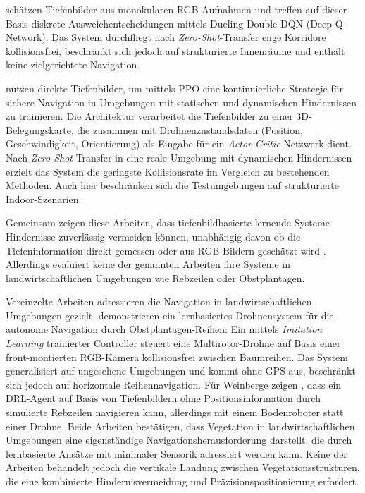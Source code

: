 \textcite{kimMonocularVisionbasedAutonomous2022} schätzen Tiefenbilder aus monokularen RGB-Aufnahmen und treffen auf dieser Basis diskrete Ausweichentscheidungen mittels Dueling-Double-DQN (Deep Q-Network). Das System durchfliegt nach \textit{Zero-Shot}-Transfer enge Korridore kollisionsfrei, beschränkt sich jedoch auf strukturierte Innenräume und enthält keine zielgerichtete Navigation.

\textcite{xuNavRLLearningSafe2024} nutzen direkte Tiefenbilder, um mittels PPO eine kontinuierliche Strategie für sichere Navigation in Umgebungen mit statischen und dynamischen Hindernissen zu trainieren. Die Architektur verarbeitet die Tiefenbilder zu einer 3D-Belegungskarte, die zusammen mit Drohnenzustandsdaten (Position, Geschwindigkeit, Orientierung) als Eingabe für ein \textit{Actor-Critic}-Netzwerk dient. Nach \textit{Zero-Shot}-Transfer in eine reale Umgebung mit dynamischen Hindernissen erzielt das System die geringste Kollisionsrate im Vergleich zu bestehenden Methoden. Auch hier beschränken sich die Testumgebungen auf strukturierte Indoor-Szenarien.

Gemeinsam zeigen diese Arbeiten, dass tiefenbildbasierte lernende Systeme Hindernisse zuverlässig vermeiden können, unabhängig davon ob die Tiefeninformation direkt gemessen \autocite{loquercioLearningHighspeedFlight2021, xuNavRLLearningSafe2024} oder aus RGB-Bildern geschätzt wird \autocite{kimMonocularVisionbasedAutonomous2022}. Allerdings evaluiert keine der genannten Arbeiten ihre Systeme in landwirtschaftlichen Umgebungen wie Rebzeilen oder Obstplantagen.

Vereinzelte Arbeiten adressieren die Navigation in landwirtschaftlichen Umgebungen gezielt. \textcite{weiVisionbasedNavigationUnmanned2025} demonstrieren ein lernbasiertes Drohnensystem für die autonome Navigation durch Obstplantagen-Reihen: Ein mittels \textit{Imitation Learning} trainierter Controller steuert eine Multirotor-Drohne auf Basis einer front-montierten RGB-Kamera kollisionsfrei zwischen Baumreihen. Das System generalisiert auf ungesehene Umgebungen und kommt ohne GPS aus, beschränkt sich jedoch auf horizontale Reihennavigation. Für Weinberge zeigen \textcite{martiniPositionAgnosticAutonomousNavigation2022}, dass ein DRL-Agent auf Basis von Tiefenbildern ohne Positionsinformation durch simulierte Rebzeilen navigieren kann, allerdings mit einem Bodenroboter statt einer Drohne. Beide Arbeiten bestätigen, dass Vegetation in landwirtschaftlichen Umgebungen eine eigenständige Navigationsherausforderung darstellt, die durch lernbasierte Ansätze mit minimaler Sensorik adressiert werden kann. Keine der Arbeiten behandelt jedoch die vertikale Landung zwischen Vegetationsstrukturen, die eine kombinierte Hindernisvermeidung und Präzisionspositionierung erfordert.

